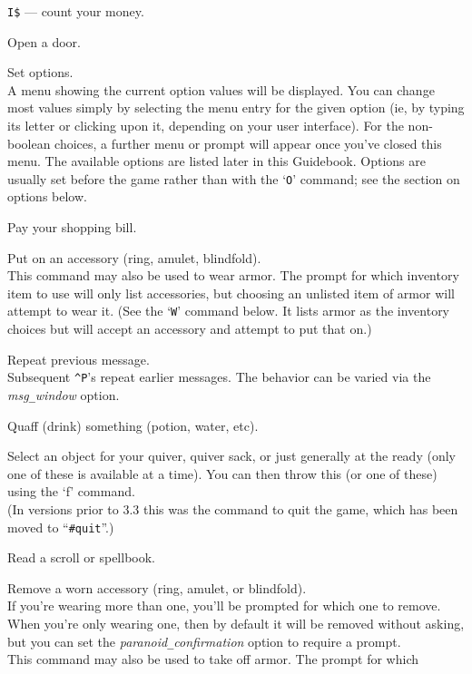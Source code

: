 {\tt I\$} --- count your money.
\item[\tb{o}]
Open a door.
\item[\tb{O}]
Set options.\\
A menu showing the current option values will be
displayed.  You can change most values simply by selecting the menu
entry for the given option (ie, by typing its letter or clicking upon
it, depending on your user interface).  For the non-boolean choices,
a further menu or prompt will appear once you've closed this menu.
The available options
are listed later in this Guidebook.  Options are usually set before the
game rather than with the `{\tt O}' command; see the section on options below.
\item[\tb{p}]
Pay your shopping bill.
\item[\tb{P}]
Put on an accessory (ring, amulet, blindfold).\\
This command may also be used to wear armor.  The prompt for
which inventory item to use will only list accessories, but choosing
an unlisted item of armor will attempt to wear it.
(See the `{\tt W}' command below.  It lists armor as the inventory
choices but will accept an accessory and attempt to put that on.)
\item[\tb{\^{}P}]
Repeat previous message.\\
Subsequent {\tt \^{}P}'s repeat earlier messages.
The behavior can be varied via the {\it msg\verb+_+window\/} option.
\item[\tb{q}]
Quaff (drink) something (potion, water, etc).
\item[\tb{Q}]
Select an object for your quiver, quiver sack, or just generally at
the ready (only one of these is available at a time).  You can then throw
this (or one of these) using
the `f' command.\\
(In versions prior to 3.3 this was the command to quit
the game, which has been moved to ``{\tt \#quit}''.)
\item[\tb{r}]
Read a scroll or spellbook.
\item[\tb{R}]
Remove a worn accessory (ring, amulet, or blindfold).\\
If you're wearing more than one, you'll be prompted for which one to
remove.  When you're only wearing one, then by default it will be removed
without asking, but you can set the
{\it paranoid\verb+_+confirmation\/}
option to require a prompt.\\
This command may also be used to take off armor.  The prompt for which
